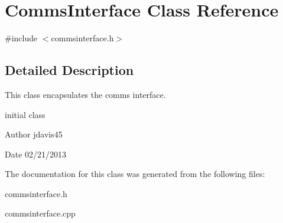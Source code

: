 \hypertarget{classCommsInterface}{\section{Comms\-Interface Class Reference}
\label{classCommsInterface}
}


{\ttfamily \#include $<$commsinterface.\-h$>$}



\subsection{Detailed Description}
This class encapsulates the comms interface.

initial class \begin{DoxyAuthor}{Author}
jdavis45 
\end{DoxyAuthor}
\begin{DoxyDate}{Date}
02/21/2013 
\end{DoxyDate}


The documentation for this class was generated from the following files\-:\begin{DoxyCompactItemize}
\item 
commsinterface.\-h\item 
commsinterface.\-cpp\end{DoxyCompactItemize}
